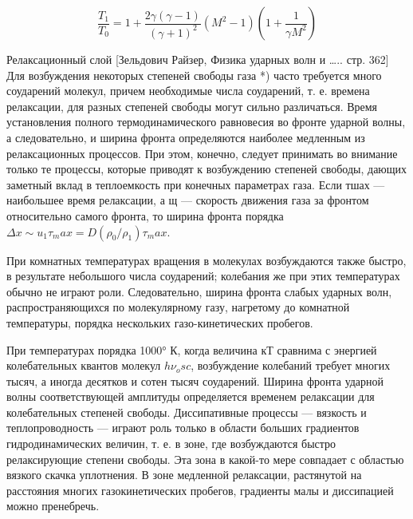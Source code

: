 \documentclass[10pt, a4paper]{article}
\begin{document}
\begin{equation}
	\frac{T_1}{T_0}=1+ \frac{2 \gamma (\gamma-1)}{(\gamma+1)^{2}} (M^2-1)(1+\frac{1}{\gamma M^{2}})
\end{equation}


Релаксационный слой [Зельдович Райзер, Физика ударных волн и ….. стр. 362]
Для возбуждения некоторых степеней свободы газа *) часто требуется много соударений молекул, причем необходимые числа соударений, т. е. времена релаксации, для разных степеней свободы могут сильно различаться. 
Время установления полного термодинамического равновесия во фронте ударной волны, а следовательно, и ширина фронта определяются наиболее медленным из релаксационных процессов. При этом, конечно, следует принимать во внимание только те процессы, которые приводят к возбуждению степеней свободы, дающих заметный вклад в теплоемкость 
при конечных параметрах газа. Если тшах — наибольшее время релаксации, а щ — скорость движения газа за фронтом относительно самого фронта, то ширина фронта порядка $\Delta x \sim u_1 \tau_max =D(\rho_0 / \rho_1) \tau_max$.

При комнатных температурах вращения в молекулах возбуждаются также быстро, в результате небольшого числа соударений; колебания же при этих температурах обычно не играют роли. Следовательно, ширина фронта слабых ударных волн, распространяющихся по молекулярному газу, нагретому до комнатной температуры, порядка нескольких газо-кинетических пробегов. 

При температурах порядка 1000° К, когда величина кТ сравнима с энергией колебательных квантов молекул $h\nu_osc$, возбуждение колебаний требует многих тысяч, а иногда десятков и сотен тысяч соударений. Ширина фронта ударной волны соответствующей амплитуды определяется временем релаксации для колебательных степеней свободы. 
Диссипативные процессы — вязкость и теплопроводность — играют роль только в области больших градиентов гидродинамических величин, т. е. в зоне, где возбуждаются быстро релаксирующие степени свободы. Эта зона в какой-то мере совпадает с областью вязкого скачка уплотнения. В зоне медленной релаксации, растянутой на расстояния многих газокинетических пробегов, градиенты малы и диссипацией можно пренебречь.
\end{document}
